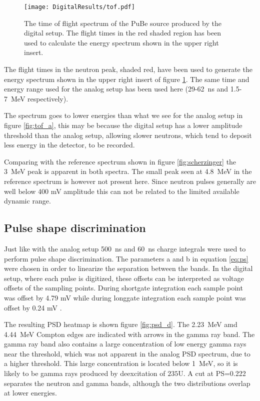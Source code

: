\documentclass[main.tex]{subfiles}
\begin{document}
\begin{figure}[ht]
    \centering
        \texttt{[image: DigitalResults/tof.pdf]}
        \caption[Time of flight spectrum, digital setup.]{The time of flight spectrum of the PuBe source produced by the digital setup. The flight times in the red shaded region has been used to calculate the energy spectrum shown in the upper right insert.}
    \label{fig:tof_d} 
\end{figure}

The flight times in the neutron peak, shaded red, have been used to generate the energy spectrum shown in the upper right insert of figure \ref{fig:tof_d}. The same time and energy range used for the analog setup has been used here (29-\SI{62}{\ns} and 1.5-\SI{7}{\MeV} respectively). 

The spectrum goes to lower energies than what we see for the analog setup in figure \ref{fig:tof_a}, this may be because the digital setup has a lower amplitude threshold than the analog setup, allowing slower neutrons, which tend to deposit less energy in the detector, to be recorded.

Comparing with the reference spectrum shown in figure \ref{fig:scherzinger} the  \SI{3}{MeV} peak is apparent in both spectra. The small peak seen at \SI{4.8}{MeV} in the reference spectrum is however not present here. Since neutron pulses generally are well below 400 mV amplitude this can not be related to the limited available dynamic range.

\subsection{Pulse shape discrimination}
Just like with the analog setup \SI{500}{ns} and \SI{60}{ns} charge integrals were used to perform pulse shape discrimination. The parameters a and b in equation \ref{eq:ps} were chosen in order to linearize the separation between the bands. In the digital setup, where each pulse is digitized, these offsets can be interpreted as voltage offsets of the sampling points. During shortgate integration each sample point was offset by 4.79 mV while during longgate integration each sample point was offset by 0.24 mV .

The resulting PSD heatmap is shown figure \ref{fig:psd_d}. The \SI{2.23}{\MeV} amd \SI{4.44}{MeV} Compton edges are indicated with arrows in the gamma ray band. The gamma ray band also contains a large concentration of low energy gamma rays near the threshold, which was not apparent in the analog PSD spectrum, due to a higher threshold. This large concentration is located below \SI{1}{MeV}, so it is likely to be gamma rays produced by deexcitation of $\text{235}$U.
A cut at PS=0.222 separates the neutron and gamma bands, although the two distributions overlap at lower energies.
\end{document}

